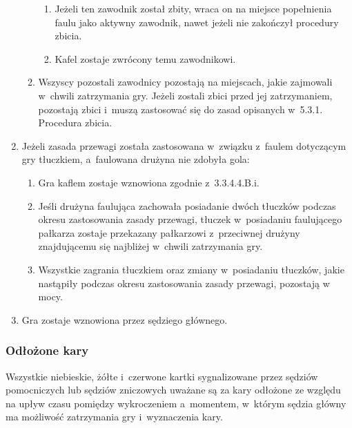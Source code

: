 \documentclass[12pt,a4paper]{article}
\begin{document}
\begin{enumerate}
\begin{enumerate}
		            \begin{enumerate}
			            \item
			                  Jeżeli ten zawodnik został zbity, wraca on na miejsce popełnienia
			                  faulu jako aktywny zawodnik, nawet jeżeli nie zakończył
			                  procedury zbicia.
			            \item
			                  Kafel zostaje zwrócony temu zawodnikowi.
		            \end{enumerate}
		      \item
		            Wszyscy pozostali zawodnicy pozostają na miejscach, jakie zajmowali
		            w~chwili zatrzymania gry. Jeżeli zostali zbici przed jej
		            zatrzymaniem, pozostają zbici i~muszą zastosować się do zasad
		            opisanych w~5.3.1. Procedura zbicia.
	      \end{enumerate}
	\item
	      Jeżeli zasada przewagi została zastosowana w~związku z~faulem
	      dotyczącym gry tłuczkiem, a~faulowana drużyna nie zdobyła gola:

	      \begin{enumerate}
		      \item
		            Gra kaflem zostaje wznowiona zgodnie z~3.3.4.4.B.i.
		      \item
		            Jeśli drużyna faulująca zachowała posiadanie dwóch tłuczków podczas
		            okresu zastosowania zasady przewagi, tłuczek w~posiadaniu
		            faulującego pałkarza zostaje przekazany pałkarzowi z~przeciwnej
		            drużyny znajdującemu się najbliżej w~chwili zatrzymania gry.
		      \item
				Wszystkie zagrania tłuczkiem oraz zmiany w~posiadaniu tłuczków, jakie nastąpiły
				podczas okresu zastosowania zasady przewagi, pozostają w mocy.
	      \end{enumerate}
	\item
	      Gra zostaje wznowiona przez sędziego głównego.
\end{enumerate}

\subsubsection{Odłożone kary}

Wszystkie niebieskie, żółte i~czerwone kartki sygnalizowane przez
sędziów pomocniczych lub sędziów zniczowych uważane są za kary odłożone
ze względu na upływ czasu pomiędzy wykroczeniem a~momentem, w~którym
sędzia główny ma możliwość zatrzymania gry i~wyznaczenia kary.
\end{document}
